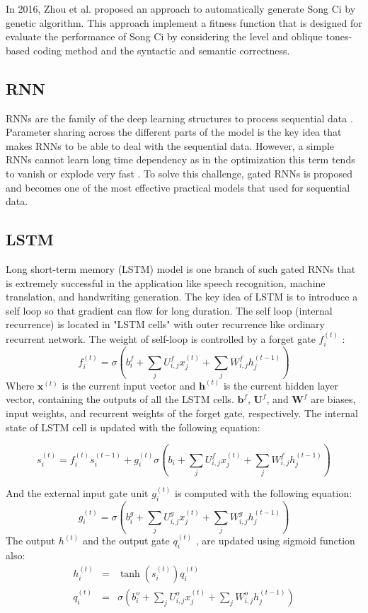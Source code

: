 In 2016, Zhou et al.\cite{zhou2010genetic} proposed an approach to automatically generate Song Ci by genetic algorithm.
%
This approach implement a fitness function that is designed for evaluate the performance of Song Ci by considering the level and oblique tones-based coding method and the syntactic and semantic correctness.


\subsection{RNN}
%
%
RNNs are the family of the deep learning structures to process sequential data  \cite{rumelhart1986}.
%
Parameter sharing across the different parts of the model is the key idea that makes RNNs to be able to deal with the sequential data.
%
However, a simple RNNs cannot learn long time dependency as in the optimization this term tends to vanish or explode very fast \cite{goodfellow2016deeplearning}.
%
To solve this challenge, gated RNNs is proposed and becomes one of the most effective practical models that used for sequential data.

\subsection{LSTM}
Long short-term memory (LSTM) model \cite{hochreiter1997lstm} is one branch of such gated RNNs that is extremely successful in the application like speech recognition, machine translation, and handwriting generation.
%
The key idea of LSTM is to introduce a self loop so that gradient can flow for long duration. The self loop (internal recurrence) is located in "LSTM cells" with outer recurrence like ordinary recurrent network. The weight of self-loop is controlled by a forget gate \(f_i^{(t)}\)
:
\[f_i^{(t)} = \sigma (b_i^f + \sum_{j}U_{i,j}^f x_j^{(t)} +\sum_{j}W_{i,j}^f h_j^{(t-1)} ) \]
Where \(\boldsymbol{x}^{(t)}\) is the current input vector and \(\boldsymbol{h}^{(t)}\) is the current hidden layer vector, containing the outputs of all the LSTM cells. \(\boldsymbol{b}^f\), \(\boldsymbol{U}^f\), and \(\boldsymbol{W}^f\) are biases, input weights, and recurrent weights of the forget gate, respectively. The internal state of LSTM cell is updated with the following equation:
\begin{small}
\[s_i^{(t)} = f_i^{(t)}s_i^{(t-1)}+g_i^{(t)}\sigma(b_i + \sum_{j}U_{i,j}^f x_j^{(t)} +\sum_{j}W_{i,j}^f h_j^{(t-1)} )\]
\end{small}
And the external input gate unit
\(g_i^{(t)} \)
is computed with the following equation:
\[g_i^{(t)} = \sigma (b_i^g + \sum_{j}U_{i,j}^g x_j^{(t)} +\sum_{j}W_{i,j}^g h_j^{(t-1)} ) \]
The output
\(h^{(t)}\)
and the output gate
\(q_i^{(t)}\)
, are updated using sigmoid function also:
\begin{eqnarray*}
h_i^{(t)} &=& \tanh (s_i^{(t)})q_i^{(t)}\\
q_i^{(t)} &=& \sigma (b_i^o + \sum_{j}U_{i,j}^o x_j^{(t)} +\sum_{j}W_{i,j}^o h_j^{(t-1)} )
\end{eqnarray*}

